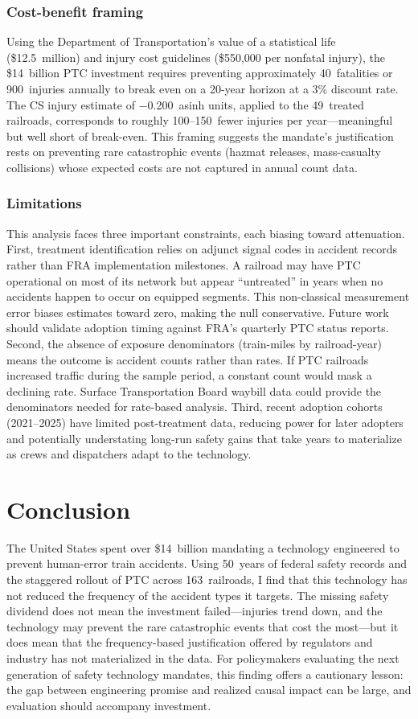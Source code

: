 \documentclass[12pt]{article}
\begin{document}
\subsubsection*{Cost-benefit framing} Using the Department of Transportation's value of a statistical life (\$12.5~million) and injury cost guidelines (\$550,000 per nonfatal injury), the \$14~billion PTC investment requires preventing approximately 40~fatalities or 900~injuries annually to break even on a 20-year horizon at a 3\% discount rate. The CS injury estimate of $-$0.200~asinh units, applied to the 49~treated railroads, corresponds to roughly 100--150~fewer injuries per year---meaningful but well short of break-even. This framing suggests the mandate's justification rests on preventing rare catastrophic events (hazmat releases, mass-casualty collisions) whose expected costs are not captured in annual count data.

\subsubsection*{Limitations} This analysis faces three important constraints, each biasing toward attenuation. First, treatment identification relies on adjunct signal codes in accident records rather than FRA implementation milestones. A railroad may have PTC operational on most of its network but appear ``untreated'' in years when no accidents happen to occur on equipped segments. This non-classical measurement error biases estimates toward zero, making the null conservative. Future work should validate adoption timing against FRA's quarterly PTC status reports. Second, the absence of exposure denominators (train-miles by railroad-year) means the outcome is accident counts rather than rates. If PTC railroads increased traffic during the sample period, a constant count would mask a declining rate. Surface Transportation Board waybill data could provide the denominators needed for rate-based analysis. Third, recent adoption cohorts (2021--2025) have limited post-treatment data, reducing power for later adopters and potentially understating long-run safety gains that take years to materialize as crews and dispatchers adapt to the technology.


\section{Conclusion}

The United States spent over \$14~billion mandating a technology engineered to prevent human-error train accidents. Using 50~years of federal safety records and the staggered rollout of PTC across 163~railroads, I find that this technology has not reduced the frequency of the accident types it targets. The missing safety dividend does not mean the investment failed---injuries trend down, and the technology may prevent the rare catastrophic events that cost the most---but it does mean that the frequency-based justification offered by regulators and industry has not materialized in the data. For policymakers evaluating the next generation of safety technology mandates, this finding offers a cautionary lesson: the gap between engineering promise and realized causal impact can be large, and evaluation should accompany investment.
\end{document}
